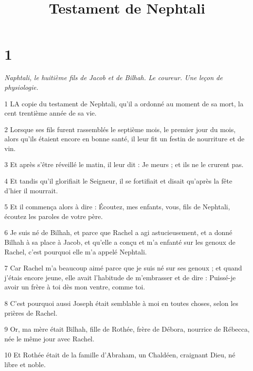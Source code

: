 

\title{Testament de Nephtali}

\chapter{1}

\par \textit{Naphtali, le huitième fils de Jacob et de Bilhah. Le coureur. Une leçon de physiologie.}

\par 1 LA copie du testament de Nephtali, qu'il a ordonné au moment de sa mort, la cent trentième année de sa vie.

\par 2 Lorsque ses fils furent rassemblés le septième mois, le premier jour du mois, alors qu'ils étaient encore en bonne santé, il leur fit un festin de nourriture et de vin.

\par 3 Et après s'être réveillé le matin, il leur dit : Je meurs ; et ils ne le crurent pas.

\par 4 Et tandis qu'il glorifiait le Seigneur, il se fortifiait et disait qu'après la fête d'hier il mourrait.

\par 5 Et il commença alors à dire : Écoutez, mes enfants, vous, fils de Nephtali, écoutez les paroles de votre père.

\par 6 Je suis né de Bilhah, et parce que Rachel a agi astucieusement, et a donné Bilhah à sa place à Jacob, et qu'elle a conçu et m'a enfanté sur les genoux de Rachel, c'est pourquoi elle m'a appelé Nephtali.

\par 7 Car Rachel m'a beaucoup aimé parce que je suis né sur ses genoux ; et quand j'étais encore jeune, elle avait l'habitude de m'embrasser et de dire : Puissé-je avoir un frère à toi dès mon ventre, comme toi.

\par 8 C'est pourquoi aussi Joseph était semblable à moi en toutes choses, selon les prières de Rachel.

\par 9 Or, ma mère était Bilhah, fille de Rothée, frère de Débora, nourrice de Rébecca, née le même jour avec Rachel.

\par 10 Et Rothée était de la famille d'Abraham, un Chaldéen, craignant Dieu, né libre et noble.

